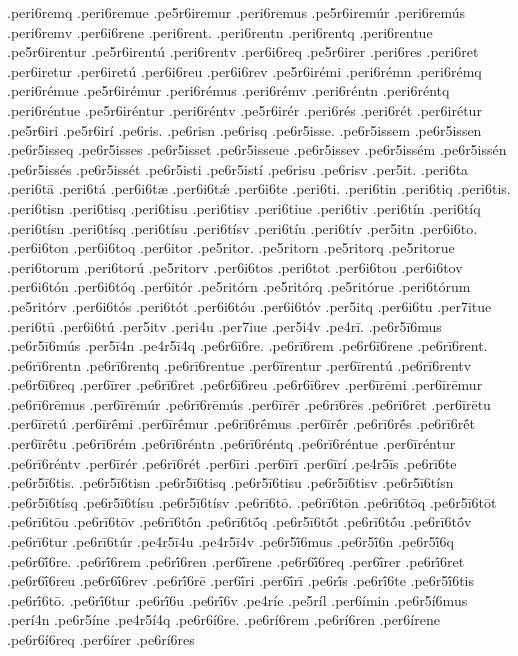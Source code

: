 {.peri6remq
.peri6remue
.pe5r6iremur
.peri6remus
.pe5r6iremúr
.peri6remús
.peri6remv
.per6i6rene
.peri6rent.
.peri6rentn
.peri6rentq
.peri6rentue
.pe5r6irentur
.pe5r6irentú
.peri6rentv
.per6i6req
.pe5r6irer
.peri6res
.peri6ret
.per6iretur
.per6iretú
.per6i6reu
.per6i6rev
.pe5r6irémi
.peri6rémn
.peri6rémq
.peri6rémue
.pe5r6irémur
.peri6rémus
.peri6rémv
.peri6réntn
.peri6réntq
.peri6réntue
.pe5r6iréntur
.peri6réntv
.pe5r6irér
.peri6rés
.peri6rét
.per6irétur
.pe5r6iri
.pe5r6irí
.pe6ris.
.pe6risn
.pe6risq
.pe6r5isse.
.pe6r5issem
.pe6r5issen
.pe6r5isseq
.pe6r5isses
.pe6r5isset
.pe6r5isseue
.pe6r5issev
.pe6r5issém
.pe6r5issén
.pe6r5issés
.pe6r5issét
.pe6r5isti
.pe6r5istí
.pe6risu
.pe6risv
.per5it.
.peri6ta
.peri6tā
.peri6tá
.per6i6tæ
.per6i6tǽ
.per6i6te
.peri6ti.
.peri6tin
.peri6tiq
.peri6tis.
.peri6tisn
.peri6tisq
.peri6tisu
.peri6tisv
.peri6tiue
.peri6tiv
.peri6tín
.peri6tíq
.peri6tísn
.peri6tísq
.peri6tísu
.peri6tísv
.peri6tíu
.peri6tív
.per5itn
.per6i6to.
.per6i6ton
.per6i6toq
.per6itor
.pe5ritor.
.pe5ritorn
.pe5ritorq
.pe5ritorue
.peri6torum
.peri6torú
.pe5ritorv
.per6i6tos
.peri6tot
.per6i6tou
.per6i6tov
.per6i6tón
.per6i6tóq
.per6itór
.pe5ritórn
.pe5ritórq
.pe5ritórue
.peri6tórum
.pe5ritórv
.per6i6tós
.peri6tót
.per6i6tóu
.per6i6tóv
.per5itq
.per6i6tu
.per7itue
.peri6tū
.per6i6tú
.per5itv
.peri4u
.per7iue
.per5i4v
.pe4rī.
.pe6r5ī6mus
.pe6r5ī6mús
.per5ī4n
.pe4r5ī4q
.pe6r6ī6re.
.pe6rī6rem
.pe6r6ī6rene
.pe6rī6rent.
.pe6rī6rentn
.pe6rī6rentq
.pe6rī6rentue
.per6īrentur
.per6īrentú
.pe6rī6rentv
.pe6r6ī6req
.per6īrer
.pe6rī6ret
.pe6r6ī6reu
.pe6r6ī6rev
.per6īrēmi
.per6īrēmur
.pe6rī6rēmus
.per6īrēmúr
.pe6rī6rēmús
.per6īrēr
.pe6rī6rēs
.pe6rī6rēt
.per6īrētu
.per6īrētú
.per6īrḗmi
.per6īrḗmur
.pe6rī6rḗmus
.per6īrḗr
.pe6rī6rḗs
.pe6rī6rḗt
.per6īrḗtu
.pe6rī6rém
.pe6rī6réntn
.pe6rī6réntq
.pe6rī6réntue
.per6īréntur
.pe6rī6réntv
.per6īrér
.pe6rī6rét
.per6īri
.per6īrī
.per6īrí
.pe4r5īs
.pe6rī6te
.pe6r5ī6tis.
.pe6r5ī6tisn
.pe6r5ī6tisq
.pe6r5ī6tisu
.pe6r5ī6tisv
.pe6r5ī6tísn
.pe6r5ī6tísq
.pe6r5ī6tísu
.pe6r5ī6tísv
.pe6rī6tō.
.pe6rī6tōn
.pe6rī6tōq
.pe6r5ī6tōt
.pe6rī6tōu
.pe6rī6tōv
.pe6rī6tṓn
.pe6rī6tṓq
.pe6r5ī6tṓt
.pe6rī6tṓu
.pe6rī6tṓv
.pe6rī6tur
.pe6rī6túr
.pe4r5ī4u
.pe4r5ī4v
.pe6r5ī́6mus
.pe6r5ī́6n
.pe6r5ī́6q
.pe6r6ī́6re.
.pe6rī́6rem
.pe6rī́6ren
.per6ī́rene
.pe6r6ī́6req
.per6ī́rer
.pe6rī́6ret
.pe6r6ī́6reu
.pe6r6ī́6rev
.pe6rī́6rē
.per6ī́ri
.per6ī́rī
.pe6rī́s
.pe6rī́6te
.pe6r5ī́6tis
.pe6rī́6tō.
.pe6rī́6tur
.pe6rī́6u
.pe6rī́6v
.pe4ríe
.pe5ríl
.per6ímin
.pe6r5í6mus
.perí4n
.pe6r5íne
.pe4r5í4q
.pe6r6í6re.
.pe6rí6rem
.pe6rí6ren
.per6írene
.pe6r6í6req
.per6írer
.pe6rí6res
}

